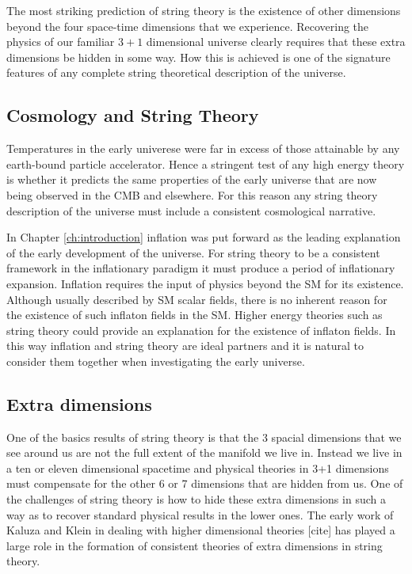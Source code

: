 The most striking prediction of string theory is the existence of other
dimensions beyond the four space-time dimensions that we
experience. Recovering the physics of our familiar $3+1$ dimensional universe
clearly requires that these extra dimensions be hidden in some way. How this is
achieved is one of the signature features of any complete string theoretical
description of the universe.

\subsection{Cosmology and String Theory}
Temperatures in the early univerese were far in excess of those attainable by
any earth-bound particle accelerator. Hence a stringent test of any high energy
theory is whether it predicts the same properties of the early universe that are
now being observed in the CMB and elsewhere.
For this reason any string theory description of the universe must include a
consistent cosmological narrative. 

In Chapter \ref{ch:introduction} inflation was put forward as the leading
explanation of the early development of the universe. For string theory to be
a consistent framework in the inflationary paradigm it must produce a period of
inflationary expansion. Inflation requires the input of physics beyond the SM
for its existence. Although usually described by SM scalar fields, there is no
inherent reason for the existence of such inflaton fields in the SM. Higher
energy theories such as string theory could provide an explanation for the
existence of inflaton fields. In this way inflation and string theory are
ideal partners and it is natural to consider them together when investigating
the early universe.



\subsection{Extra dimensions}
One of the basics results of string theory is that the 3 spacial dimensions that we see
around us are not the full extent of the manifold we live in. Instead we live in a ten or
eleven dimensional spacetime and physical theories in 3+1 dimensions must compensate for the
other 6 or 7 dimensions that are hidden from us. One of the challenges of string theory is how 
to hide these extra dimensions in such a way as to recover standard physical results in the lower
ones. The early work of Kaluza and Klein in dealing with higher dimensional theories [cite] has played
a large role in the formation of consistent theories of extra dimensions in string theory.


